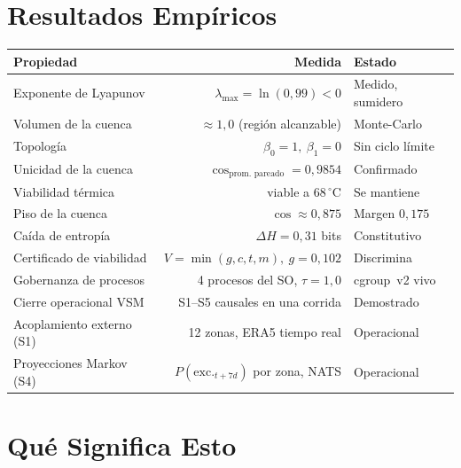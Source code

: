 \documentclass[11pt, a4paper]{article}
\begin{document}
\section*{Resultados Empíricos}

\begin{tabular}{lrl}
\textbf{Propiedad} & \textbf{Medida} & \textbf{Estado} \\
\hline
Exponente de Lyapunov      & $\lambda_\text{max} = \ln(0{,}99) < 0$  & Medido, sumidero \\
Volumen de la cuenca       & $\approx 1{,}0$ (región alcanzable)     & Monte-Carlo \\
Topología                  & $\beta_0 = 1,\ \beta_1 = 0$             & Sin ciclo límite \\
Unicidad de la cuenca      & $\cos_\text{prom.\ pareado} = 0{,}9854$ & Confirmado \\
Viabilidad térmica         & viable a $68\,^\circ\mathrm{C}$         & Se mantiene \\
Piso de la cuenca          & $\cos \approx 0{,}875$                  & Margen $0{,}175$ \\
Caída de entropía          & $\Delta H = 0{,}31$ bits                & Constitutivo \\
Certificado de viabilidad  & $V = \min(g,c,t,m),\ g = 0{,}102$      & Discrimina \\
Gobernanza de procesos     & 4 procesos del SO, $\tau = 1{,}0$       & cgroup~v2 vivo \\
Cierre operacional VSM     & S1--S5 causales en una corrida          & Demostrado \\
\hline
Acoplamiento externo (S1)  & 12 zonas, ERA5 tiempo real              & Operacional \\
Proyecciones Markov (S4)   & $P(\text{exc.}_{t+7d})$ por zona, NATS  & Operacional \\
\end{tabular}

\section*{Qué Significa Esto}
\end{document}
